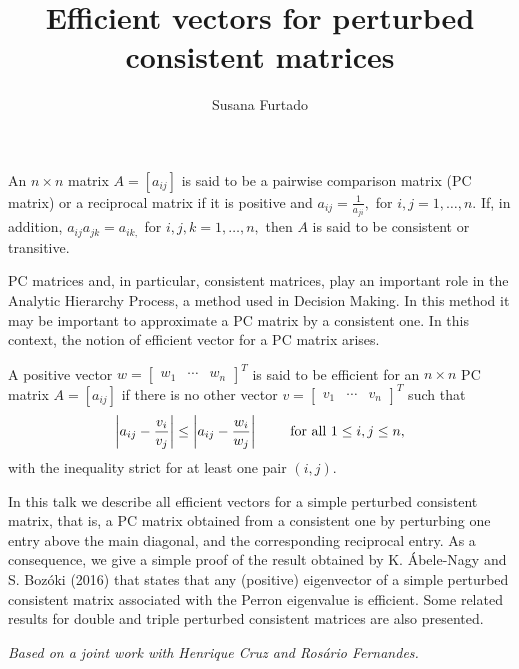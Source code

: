\documentclass[a4paper]{amsart}
\begin{document}
\date{}
\title{Efficient vectors for perturbed consistent matrices}
\author{Susana Furtado}
\address{CEAFEL and Faculdade de Economia do Porto}
\maketitle





An $n\times n$ matrix $A=[a_{ij}]$ is said to be a pairwise comparison
matrix (PC matrix) or a reciprocal matrix if it is positive and $a_{ij}=%
\frac{1}{a_{ji}},$ for $i,j=1,\ldots ,n.$ If, in addition, $%
a_{ij}a_{jk}=a_{ik,}$ for $i,j,k=1,\ldots ,n,$ then $A$ is said to be
consistent or transitive.

PC matrices and, in particular, consistent matrices, play an important role
in the Analytic Hierarchy Process, a method used in Decision Making. In this
method it may be important to approximate a PC matrix by a consistent one.
In this context, the notion of efficient vector for a PC matrix arises.

A positive vector $w=\left[ 
\begin{array}{ccc}
w_{1} & \cdots  & w_{n}%
\end{array}%
\right] ^{T}$ is said to be efficient for an $n\times n$ PC matrix $%
A=[a_{ij}]$ if there is no other vector $v=\left[ 
\begin{array}{ccc}
v_{1} & \cdots  & v_{n}%
\end{array}%
\right] ^{T}$ such that 
\[
\left\vert a_{ij}-\frac{v_{i}}{v_{j}}\right\vert \leq \left\vert a_{ij}-%
\frac{w_{i}}{w_{j}}\right\vert \text{ \qquad for all }1\leq i,j\leq n,
\]%
with the inequality strict for at least one pair $(i,j).$ 

In this talk we describe all efficient vectors for a simple perturbed
consistent matrix, that is, a PC matrix obtained from a consistent one by
perturbing one entry above the main diagonal, and the corresponding
reciprocal entry. As a consequence, we give a simple proof of the result
obtained by K. \'{A}bele-Nagy and S. Boz\'{o}ki (2016) that states that any
(positive) eigenvector of a simple perturbed consistent matrix associated
with the Perron eigenvalue is efficient. Some related results for double and
triple perturbed consistent matrices are also presented.


\emph{Based on a joint work with Henrique Cruz and Ros\'{a}rio Fernandes.}
\end{document}
